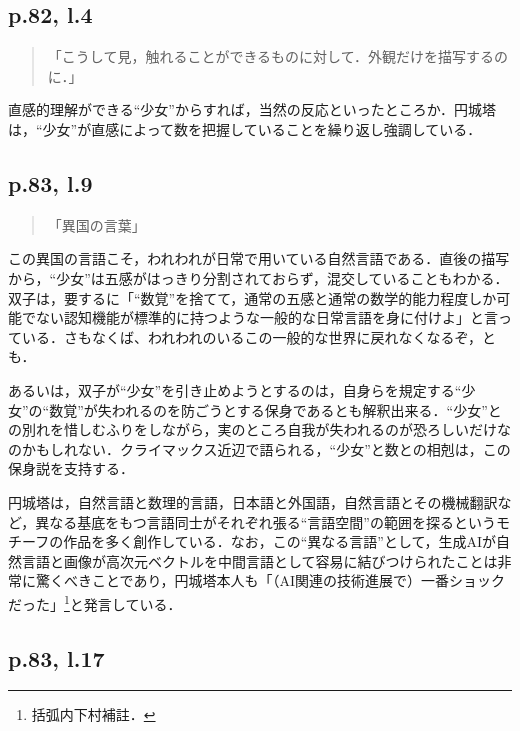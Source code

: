 \documentclass[10pt, a5paper, twoside]{jsarticle}
\theoremstyle{definition}
\begin{document}
		\subsection{p.82, l.4}

			\begin{quote}

				「こうして見，触れることができるものに対して．外観だけを描写するのに．」
				
			\end{quote}

			直感的理解ができる“少女”からすれば，当然の反応といったところか．円城塔は，“少女”が直感によって数を把握していることを繰り返し強調している．

		\subsection{p.83, l.9}

			\begin{quote}

				「異国の言葉」
				
			\end{quote}

			この異国の言語こそ，われわれが日常で用いている自然言語である．直後の描写から，“少女”は五感がはっきり分割されておらず，混交していることもわかる．双子は，要するに「“数覚”を捨てて，通常の五感と通常の数学的能力程度しか可能でない認知機能が標準的に持つような一般的な日常言語を身に付けよ」と言っている．さもなくば、われわれのいるこの一般的な世界に戻れなくなるぞ，とも．

			あるいは，双子が“少女”を引き止めようとするのは，自身らを規定する“少女”の“数覚”が失われるのを防ごうとする保身であるとも解釈出来る．“少女”との別れを惜しむふりをしながら，実のところ自我が失われるのが恐ろしいだけなのかもしれない．クライマックス近辺で語られる，“少女”と数との相剋は，この保身説を支持する．

			円城塔は，自然言語と数理的言語，日本語と外国語，自然言語とその機械翻訳など，異なる基底をもつ言語同士がそれぞれ張る“言語空間”の範囲を探るというモチーフの作品を多く創作している．なお，この“異なる言語”として，生成AIが自然言語と画像が高次元ベクトルを中間言語として容易に結びつけられたことは非常に驚くべきことであり，円城塔本人も「（AI関連の技術進展で）一番ショックだった」\footnote{括弧内下村補註．}\cite{zdn}と発言している．

		\subsection{p.83, l.17}
\end{document}
